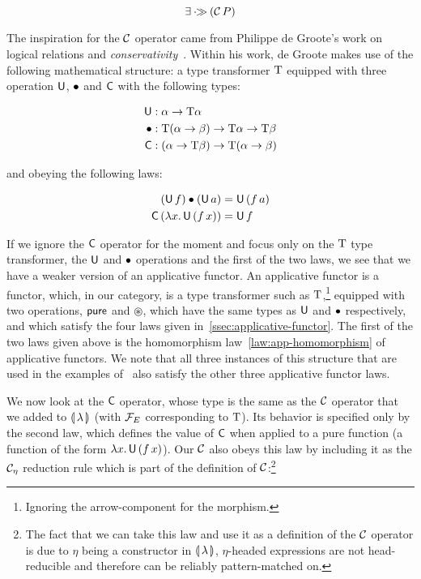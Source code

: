 $$
  \exists \mathbin{\cdot\!\!\gg} (\mathcal{C}\,P)
$$

The inspiration for the $\mathcal{C}$ operator came from Philippe de Groote's work
on logical relations and
\emph{conservativity}~\cite{degroote2015conservativity}. Within his work,
de Groote makes use of the following mathematical structure: a type
transformer $\text{T}$ equipped with three operation $\mathsf{U}$, $\mathbin{\bullet}$ and $\mathsf{C}$
with the following types:

\begin{align*}
  \mathsf{U} &: \alpha \to \text{T} \alpha \\
  \mathbin{\bullet} &: \text{T}(\alpha \to \beta) \to \text{T} \alpha \to \text{T} \beta \\
  \mathsf{C} &: (\alpha \to \text{T} \beta) \to \text{T} (\alpha \to \beta)
\end{align*}

and obeying the following laws:

\begin{align*}
  (\mathsf{U}\,f) \mathbin{\bullet} (\mathsf{U}\,a) &= \mathsf{U}\,(f\,a) \\
  \mathsf{C}\,(\lambda x.\, \mathsf{U}\,(f\,x)) &= \mathsf{U}\,f
\end{align*}

If we ignore the $\mathsf{C}$ operator for the moment and focus only on the $\text{T}$
type transformer, the $\mathsf{U}$ and $\mathbin{\bullet}$ operations and the first of the
two laws, we see that we have a weaker version of an applicative
functor. An applicative functor is a functor, which, in our category, is a
type transformer such as $\text{T}$,\footnote{Ignoring the arrow-component for
  the morphism.} equipped with two operations, $\mathsf{pure}$ and $\circledast$,
which have the same types as $\mathsf{U}$ and $\mathbin{\bullet}$ respectively, and which
satisfy the four laws given in~\ref{ssec:applicative-functor}. The first of
the two laws given above is the homomorphism law~\ref{law:app-homomorphism}
of applicative functors. We note that all three instances of this structure
that are used in the examples of~\cite{degroote2015conservativity} also
satisfy the other three applicative functor laws.

We now look at the $\mathsf{C}$ operator, whose type is the same as the $\mathcal{C}$
operator that we added to ${\llparenthesis \, \lambda \, \rrparenthesis}$ (with $\mathcal{F}_E$ corresponding to
$\text{T}$). Its behavior is specified only by the second law, which defines the
value of $\mathsf{C}$ when applied to a pure function (a function of the form
$\lambda x.\, \mathsf{U}\,(f\,x)$). Our $\mathcal{C}$ also obeys this law by
including it as the $\mathcal{C}_\eta$ reduction rule which is part of the
definition of $\mathcal{C}$:\footnote{The fact that we can take this law and use it
  as a definition of the $\mathcal{C}$ operator is due to $\eta$ being a
  constructor in ${\llparenthesis \, \lambda \, \rrparenthesis}$, $\eta$-headed expressions are not head-reducible
  and therefore can be reliably pattern-matched on.}


